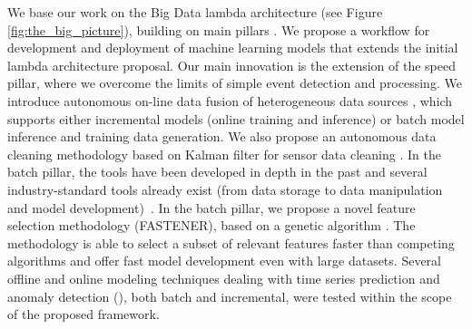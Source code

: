We base our work on the Big Data lambda architecture (see Figure \ref{fig:the_big_picture}), building on main pillars \cite{kenda:2022:water-framework}.
We propose a workflow for development and deployment of machine learning models that extends the initial lambda architecture proposal.
Our main innovation is the extension of the speed pillar, where we overcome the limits of simple event detection and processing.
We introduce autonomous on-line data fusion of heterogeneous data sources \cite{kenda:2019:fusion}, which supports either incremental models (online training and inference) or batch model inference and training data generation.
We also propose an autonomous data cleaning methodology based on Kalman filter for sensor data cleaning \cite{kenda:2018:autonomous}.
In the batch pillar, the tools have been developed in depth in the past and several industry-standard tools already exist (from data storage to data manipulation and model development)~\cite{john:2017:datalake}.
In the batch pillar, we propose a novel feature selection methodology (FASTENER), based on a genetic algorithm \cite{koprivec:2020:fastener}.
The methodology is able to select a subset of relevant features faster than competing algorithms and offer fast model development even with large datasets.
Several offline and online modeling techniques dealing with time series prediction and anomaly detection (\cite{kenda:2022:water-framework, kenda:2015:modelling, kenda:2015:modelling2, petkovsek:2021:anomaly, costa:2021:entropy}), both batch and incremental, were tested within the scope of the proposed framework.

